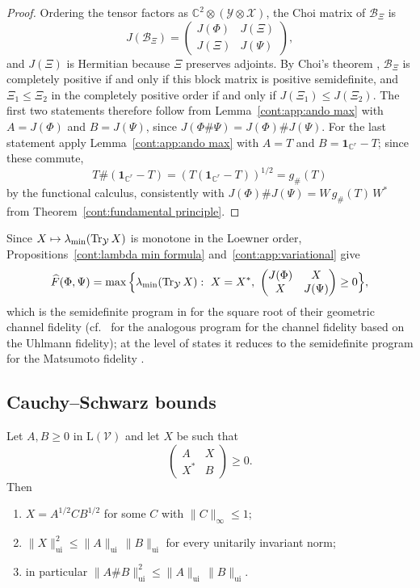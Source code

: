 \begin{proof}
Ordering the tensor factors as $\mathbb{C}^2\otimes(\mathcal{Y}\otimes\mathcal{X})$, the Choi matrix of $\mathcal{B}_\Xi$ is
\[
J(\mathcal{B}_\Xi)=\begin{pmatrix}J(\Phi)&J(\Xi)\\J(\Xi)&J(\Psi)\end{pmatrix},
\]
and $J(\Xi)$ is Hermitian because $\Xi$ preserves adjoints. By Choi's theorem \cite{Choi1975}, $\mathcal{B}_\Xi$ is completely positive if and only if this block matrix is positive semidefinite, and $\Xi_1\leq\Xi_2$ in the completely positive order if and only if $J(\Xi_1)\leq J(\Xi_2)$. The first two statements therefore follow from Lemma~\ref{cont:app:ando max} with $A=J(\Phi)$ and $B=J(\Psi)$, since $J(\Phi\#\Psi)=J(\Phi)\#J(\Psi)$. For the last statement apply Lemma~\ref{cont:app:ando max} with $A=T$ and $B=\mathbf{1}_{\mathbb{C}^r}-T$; since these commute,
\[
T\#(\mathbf{1}_{\mathbb{C}^r}-T)=(T(\mathbf{1}_{\mathbb{C}^r}-T))^{1/2}=g_\#(T)
\]
by the functional calculus, consistently with $J(\Phi)\#J(\Psi)=W\,g_\#(T)\,W^*$ from Theorem~\ref{cont:fundamental principle}.
\end{proof}
 
\begin{remark}
Since $X\mapsto\lambda_{\min}(\operatorname{Tr}_{\mathcal{Y}}X)$ is monotone in the Loewner order, Propositions~\ref{cont:lambda min formula} and~\ref{cont:app:variational} give
\[
\widehat{F}(\Phi,\Psi)=\max\Big\{\lambda_{\min}(\Tr_{\mathcal{Y}}X):\ X=X^*,\ \begin{pmatrix}J(\Phi)&X\\X&J(\Psi)\end{pmatrix}\geq0\Big\},
\]
which is the semidefinite program in \cite[eq.~(20)]{NuradhaWilde2025} for the square root of their geometric channel fidelity (cf.\ \cite{KatariyaWilde2021} for the analogous program for the channel fidelity based on the Uhlmann fidelity); at the level of states it reduces to the semidefinite program for the Matsumoto fidelity \cite{matsumoto2010reverse,cree2020fidelity}.
\end{remark}
 
\subsection{Cauchy--Schwarz bounds}
 
\begin{lemma}\label{cont:app:block cs}
Let $A,B\geq0$ in $\mathrm{L}(\mathcal{V})$ and let $X$ be such that
\[
\begin{pmatrix}A&X\\X^*&B\end{pmatrix}\geq0.
\]
Then
\begin{enumerate}
\item $X=A^{1/2}CB^{1/2}$ for some $C$ with $\|C\|_\infty\leq1$;
\item $\|X\|_{\mathrm{ui}}^2\leq\|A\|_{\mathrm{ui}}\,\|B\|_{\mathrm{ui}}$ for every unitarily invariant norm;
\item in particular $\|A\#B\|_{\mathrm{ui}}^2\leq\|A\|_{\mathrm{ui}}\,\|B\|_{\mathrm{ui}}$.
\end{enumerate}
\end{lemma}
 
